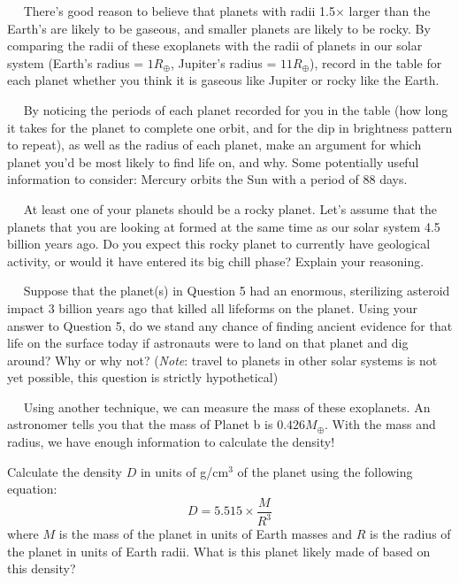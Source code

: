 \documentclass[12pt]{article}
\newcommand{\question}[1]{\vspace{10mm} \noindent {\bf #1)}~~}
\begin{document}
\question{3} There's good reason to believe that planets with radii 1.5$\times$ larger than the Earth's are likely to be gaseous, and smaller planets are likely to be rocky. By comparing the radii of these exoplanets with the radii of planets in our solar system (Earth's radius = $1 R_\oplus$, Jupiter's radius = $11 R_\oplus$), record in the table for each planet whether you think it is gaseous like Jupiter or rocky like the Earth.


\question{4} By noticing the periods of each planet recorded for you in the table (how long it takes for the planet to complete one orbit, and for the dip in brightness pattern to repeat), as well as the radius of each planet, make an argument for which planet you'd be most likely to find life on, and why. Some potentially useful information to consider: Mercury orbits the Sun with a period of 88 days.
\vspace{4 cm}

\pagebreak
\question{5} At least one of your planets should be a rocky planet. Let's assume that the planets that you are looking at formed at the same time as our solar system 4.5 billion years ago. Do you expect this rocky planet to currently have geological activity, or would it have entered its big chill phase? Explain your reasoning.
\vspace{4 cm}


\question{6} Suppose that the planet(s) in Question 5 had an enormous, sterilizing asteroid impact 3 billion years ago that killed all lifeforms on the planet. Using your answer to Question 5, do we stand any chance of finding ancient evidence for that life on the surface today if astronauts were to land on that planet and dig around? Why or why not? ({\it Note}: travel to planets in other solar systems is not yet possible, this question is strictly hypothetical)
\vspace{4 cm}

\question{7} Using another technique, we can measure the mass of these exoplanets. An astronomer tells you that the mass of Planet b is $0.426 M_\oplus$. With the mass and radius, we have enough information to calculate the density! 

Calculate the density $D$ in units of g/cm$^3$ of the planet using the following equation: 
\begin{equation}
D = 5.515 \times \frac{M}{R^3}
\end{equation}
where $M$ is the mass of the planet in units of Earth masses and $R$ is the radius of the planet in units of Earth radii. What is this planet likely made of based on this density?
\end{document}
